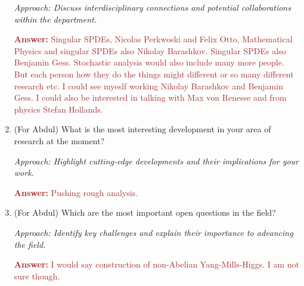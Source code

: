 \documentclass[12pt]{article}
\numberwithin{equation}{section}
\newcommand{\brown}[1]{\textcolor{brown}{#1}}
\newcommand{\blue}[1]{\textcolor{blueblue}{#1}}
\begin{document}
\begin{enumerate}
    \textit{Approach: Discuss interdisciplinary connections and potential collaborations within the department.}

    \brown{ \textbf{Answer:} Singular SPDEs, Nicolas Perkwoski and Felix Otto, Mathematical Physics and singular SPDEs also Nikolay Barashkov. Singular SPDEs also Benjamin Gess. Stochastic analysis would also include many more people. But each person how they do the things might different or so many different research etc. I could see myeslf working Nikolay Barashkov and Benjamin Gess. I could also be interested in talking with Max von Renesse and from physics Stefan Hollands.  }
    
    \item \blue{(For Abdul)}  What is the most interesting development in your area of research at the moment?
    
    \textit{Approach: Highlight cutting-edge developments and their implications for your work.}    

    \brown{\textbf{Answer:} Pushing rough analysis.}

    \item \blue{(For Abdul)} Which are the most important open questions in the field?
    
    \textit{Approach: Identify key challenges and explain their importance to advancing the field.}

    \brown{\textbf{Answer:} I would say construction of non-Abelian Yang-Mills-Higgs. I am not sure though.}
\end{enumerate}
\end{document}
